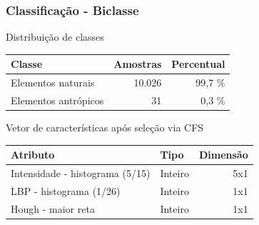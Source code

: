 \documentclass[t]{beamer}
\begin{document}
\begin{frame}[c]
	\frametitle{Classificação - Biclasse}

	\centering
	Distribuição de classes

	\small{
		\begin{table}[h]
		\centering
		\begin{tabulary}{\linewidth}{|L|R|R|}
		\hline
		\textbf{Classe} & \textbf{Amostras} & \textbf{Percentual} \\ \hline
		Elementos naturais   & 10.026 & 99,7 \% \\ \hline
		Elementos antrópicos &     31 &  0,3 \% \\ \hline
		\end{tabulary}
	\end{table}
	}

	\centering
	Vetor de características após seleção via CFS

	\small{
		\begin{table}[h]
		\centering
		\begin{tabulary}{\linewidth}{|L|L|R|}
		\hline
		\textbf{Atributo} & \textbf{Tipo} & \textbf{Dimensão} \\ \hline
		Intensidade - histograma (5/15) & Inteiro & 5x1 \\ \hline
		LBP - histograma (1/26)         & Inteiro & 1x1 \\ \hline
		Hough - maior reta              & Inteiro & 1x1 \\ \hline
		\end{tabulary}
		\end{table}
	}

\end{frame}
\end{document}
